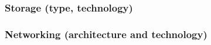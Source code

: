 \newpage

\subsubsection{Storage (type, technology)}\label{subsubsection: Storage (type, technology)}

\subsubsection{Networking (architecture and technology)}\label{subsubsection: Networking (architecture and technology)}
